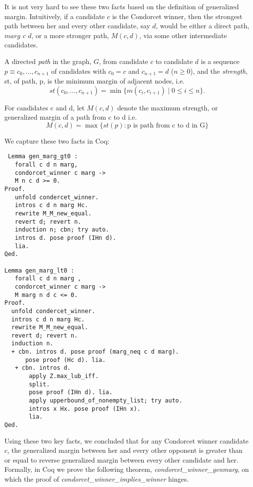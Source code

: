  
 It is not very hard to see these two facts based on the definition of generalized margin. Intuitively, 
 if a candidate $c$ is the Condorcet winner, then the strongest path between her and every other 
 candidate, say $d$,  would be either a direct path, $marg$ $c$ $d$, or a more stronger path, $M (c, d)$, 
 via some other intermediate candidates. 
  
 \begin{displayquote}
 A directed \emph{path} in the graph, $G$, from
candidate $c$ to candidate $d$ is a sequence $p \equiv c_0, \dots, c_{n+1}$
of candidates with $c_0 = c$ and $c_{n+1} = d$ ($n \geq 0$), and the
\emph{strength}, st, of path, p, is the minimum margin of adjacent
nodes, i.e.
\[ st(c_0, \dots, c_{n+1}) = \min \lbrace m (c_i, c_{i+1}) \mid 0
\leq i \leq n \rbrace. \]
\item For candidates c and d, let $M(c, d)$ denote the maximum strength, or generalized margin of a path
	from c to d i.e. 
	\[ M(c, d) = \max \lbrace st (p) : \text{p is path from c to d in G} \rbrace\]
  
   \end{displayquote}
   
 We capture these two facts in Coq:
 
 \begin{verbatim}
 Lemma gen_marg_gt0 :
   forall c d n marg, 
   condorcet_winner c marg -> 
   M n c d >= 0.
Proof. 
   unfold condercet_winner.
   intros c d n marg Hc.
   rewrite M_M_new_equal. 
   revert d; revert n.
   induction n; cbn; try auto.
   intros d. pose proof (IHn d).
   lia.
Qed.

Lemma gen_marg_lt0 :
   forall c d n marg , 
   condorcet_winner c marg ->
   M marg n d c <= 0.
Proof.
  unfold condercet_winner.
  intros c d n marg Hc.
  rewrite M_M_new_equal.
  revert d; revert n.
  induction n.
  + cbn. intros d. pose proof (marg_neq c d marg).
      pose proof (Hc d). lia. 
   + cbn. intros d.
       apply Z.max_lub_iff. 
       split.
       pose proof (IHn d). lia.
       apply upperbound_of_nonempty_list; try auto.
       intros x Hx. pose proof (IHn x).
       lia.
Qed.
\end{verbatim}   
 
 Using these two key facts, we concluded that for any Condorcet winner candidate $c$, 
 the generalized margin between her and every other opponent is greater than or equal 
 to reverse generalized margin between every other candidate and her.  Formally, 
 in Coq we prove the following theorem, \textit{condorcet\_winner\_genmarg}, on which  the proof of 
 \textit{condorcet\_winner\_implies\_winner} hinges. 
 
